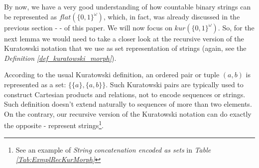 By now, we have a very good understanding of how countable binary strings can be represented as $flat(\{0,1\}^\omega)$, which, in fact, was already discussed in the previous section - \textit{} - of this paper. We will now focus on $kur(\{0,1\}^\omega)$. So, for the next lemma we would need to take a closer look at the recursive version of the Kuratowski notation that we use as set representation of strings (again, see the \textit{Definition \ref{def_kuratowski_morph}}). 

According to the usual Kuratowski definition, an ordered pair or tuple $(a, b)$ is represented as a set: $\{\{a\}, \{a, b\}\}$. Such Kuratowski pairs are typically used to construct Cartesian products and relations, not to encode sequences or strings. Such definition doesn't extend naturally to sequences of more than two elements. On the contrary, our recursive version of the Kuratowski notation can do exactly the opposite - represent strings\footnote{See an example of \textit{String concatenation encoded as sets} in \textit{Table \ref{Tab:ExmplRecKurMorph}}}.

